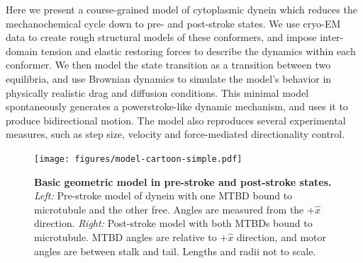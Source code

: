 \documentclass[9pt,twocolumn,twoside]{article}
\begin{document}
Here we present a course-grained model of cytoplasmic dynein which reduces the mechanochemical cycle down to pre- and post-stroke states. We use cryo-EM data to create rough structural models of these conformers, and impose inter-domain tension and elastic restoring forces to describe the dynamics within each conformer. We then model the state transition as a transition between two equilibria, and use Brownian dynamics to simulate the model's behavior in physically realistic drag and diffusion conditions. This minimal model spontaneously generates a powerstroke-like dynamic mechanism, and uses it to produce bidirectional motion. The model also reproduces several experimental measures, such as step size, velocity and force-mediated directionality control.

\begin{figure}[tbhp]
\centering
\texttt{[image: figures/model-cartoon-simple.pdf]}
\caption{\textbf{Basic geometric model in pre-stroke and post-stroke states.} \textit{Left: } Pre-stroke model of dynein with one MTBD bound to microtubule and the other free. Angles are measured from the $+\hat{x}$ direction. \textit{Right: } Post-stroke model with both MTBDs bound to microtubule. MTBD angles are relative to $+\hat{x}$ direction, and motor angles are between stalk and tail. Lengths and radii not to scale.}
\label{fig:model}
\end{figure}
\end{document}
